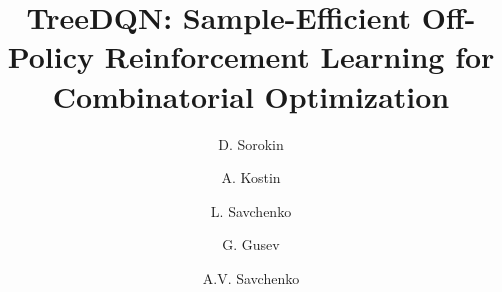\documentclass[preprint,12pt]{elsarticle} %
\theoremstyle{plain}
\theoremstyle{definition}
\theoremstyle{remark}
\begin{document}
\begin{frontmatter}



\title{TreeDQN: Sample-Efficient Off-Policy Reinforcement Learning for Combinatorial Optimization} %

\author[1]{D. Sorokin}
\author[2]{A. Kostin}
\author[3]{L. Savchenko}
\author[2]{G. Gusev}
\author[2,3]{A.V. Savchenko}

\address[1]{Next Step Fusion\\
Luxembourg, Luxembourg
}
\address[2]{Sber AI Lab\\
Moscow, Russia
}
\address[3]{Laboratory for Theoretical Foundations of AI Models, HSE University\\
Moscow, Russia
}



\end{frontmatter}
\end{document}
